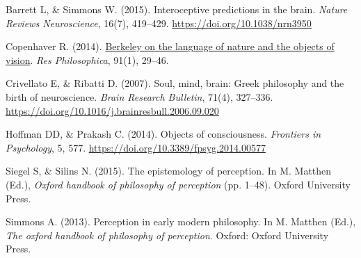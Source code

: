\documentclass[
  12pt,
  a4paper,
]{article}
\newlength{\cslhangindent}
\newlength{\cslentryspacingunit} %
\newenvironment{CSLReferences}[2] %
 {%
  \setlength{\parindent}{0pt}
  \ifodd #1
  \let\oldpar\par
  \def\par{\hangindent=\cslhangindent\oldpar}
  \fi
  \setlength{\parskip}{#2\cslentryspacingunit}
 }%
 {}
\begin{document}
\hypertarget{refs}{}
\begin{CSLReferences}{1}{0}
\leavevmode{}%
Barrett L, \& Simmons W.{ (2015)}. Interoceptive predictions in the
brain. \emph{Nature Reviews Neuroscience}, 16(7), 419--429.
\url{https://doi.org/10.1038/nrn3950}

\leavevmode{}%
Copenhaver R.{ (2014)}. \href{}{Berkeley on the language of nature and
the objects of vision}. \emph{Res Philosophica}, 91(1), 29--46.

\leavevmode{}%
Crivellato E, \& Ribatti D.{ (2007)}. Soul, mind, brain: Greek
philosophy and the birth of neuroscience. \emph{Brain Research
Bulletin}, 71(4), 327--336.
\url{https://doi.org/10.1016/j.brainresbull.2006.09.020}

\leavevmode{}%
Hoffman DD, \& Prakash C.{ (2014)}. Objects of consciousness.
\emph{Frontiers in Psychology}, 5, 577.
\url{https://doi.org/10.3389/fpsyg.2014.00577}

\leavevmode{}%
Siegel S, \& Silins N.{ (2015)}. The epistemology of perception. In M.
Matthen (Ed.), \emph{Oxford handbook of philosophy of perception} (pp.
1--48). Oxford University Press.

\leavevmode{}%
Simmons A.{ (2013)}. Perception in early modern philosophy. In M.
Matthen (Ed.), \emph{The oxford handbook of philosophy of perception}.
Oxford: Oxford University Press.

\end{CSLReferences}
\end{document}
